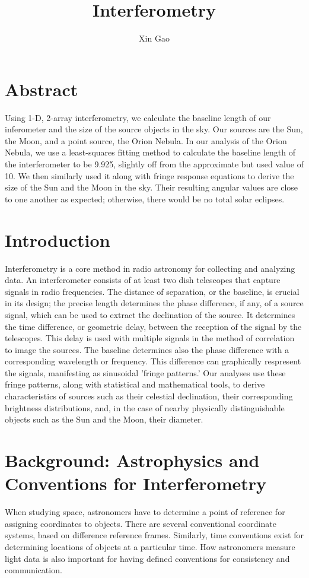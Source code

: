 \documentclass{article}
\begin{document}
\title{Interferometry}
\author{Xin Gao}
\date{}
\maketitle

\section{Abstract}
Using 1-D, 2-array interferometry, we calculate the baseline length of
our inferometer and the size of the source objects in the sky. Our
sources are the Sun, the Moon, and a point source, the Orion Nebula. In
our analysis of the Orion Nebula, we use a least-squares fitting method
to calculate the baseline length of the interferometer to be 9.925,
slightly off from the approximate but used value of 10. We then
similarly used it along with fringe response equations to derive the
size of the Sun and the Moon in the sky. Their resulting angular values
are close to one another as expected; otherwise, there would be no total
solar eclipses. 
\section{Introduction} 
Interferometry is a core method in radio astronomy for collecting and
analyzing data. An interferometer consists of at least two dish telescopes
that capture signals in radio frequencies. The distance of separation,
or the baseline, is crucial in its design; the precise length determines
the phase difference, if any, of a source signal, which can be used to
extract the declination of the source. It determines the time difference,
or geometric delay, between the reception of the signal by the
telescopes. This delay is used with multiple signals in the method of 
correlation to image the sources. The baseline determines also the phase
difference with a  corresponding wavelength or frequency. This
difference can graphically respresent the signals, manifesting as
sinusoidal 'fringe patterns.' Our analyses use these fringe patterns,
along with statistical and mathematical tools, to derive characteristics
of sources such as their celestial declination, their corresponding
brightness distributions, and, in the case of nearby physically
distinguishable objects such as the Sun and the Moon, their diameter. 

\section{Background: Astrophysics and Conventions for Interferometry}
When studying space, astronomers have to determine a point of reference
for assigning coordinates to objects. There are several conventional
coordinate systems, based on difference reference frames. Similarly,
time conventions exist for determining locations of objects at a
particular time. How astronomers measure light data is also important
for having defined conventions for consistency and communication.
\end{document}
